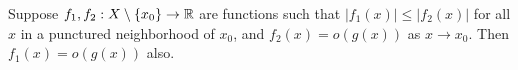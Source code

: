\begin{exercise} \label{less-than-small-is-small}
	Suppose $f_1, f_2 : X \setminus \{x_0\} \to \mathbb{R}$ are functions such that $|f_1(x)| \leq |f_2(x)|$ for all $x$ in a punctured neighborhood of $x_0$, and $f_2(x) = o(g(x))$ as $x \to x_0$. Then $f_1(x) = o(g(x))$ also. 
\end{exercise}

